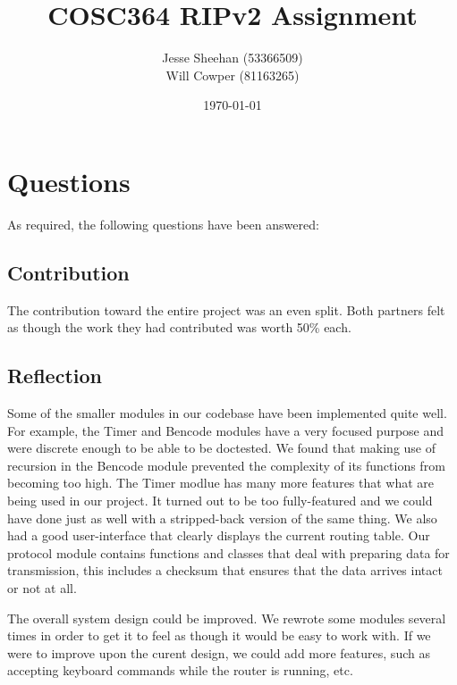 \documentclass[11pt]{article} %
\title{COSC364 RIPv2 Assignment}
\date{\today}
\author{Jesse Sheehan (53366509)\\ Will Cowper (81163265)}
\begin{document}
\maketitle

\tableofcontents

\newpage



\section{Questions}

As required, the following questions have been answered:

\subsection{Contribution}
The contribution toward the entire project was an even split. Both partners felt as though the work they had contributed was worth 50\% each.

\subsection{Reflection}

Some of the smaller modules in our codebase have been implemented quite well. For example, the Timer and Bencode modules have a very focused purpose and were discrete enough to be able to be doctested. We found that making use of recursion in the Bencode module prevented the complexity of its functions from becoming too high. The Timer modlue has many more features that what are being used in our project. It turned out to be too fully-featured and we could have done just as well with a stripped-back version of the same thing. We also had a good user-interface that clearly displays the current routing table. Our protocol module contains functions and classes that deal with preparing data for transmission, this includes a checksum that ensures that the data arrives intact or not at all.



The overall system design could be improved. We rewrote some modules several times in order to get it to feel as though it would be easy to work with. If we were to improve upon the curent design, we could add more features, such as accepting keyboard commands while the router is running, etc.
\end{document}
